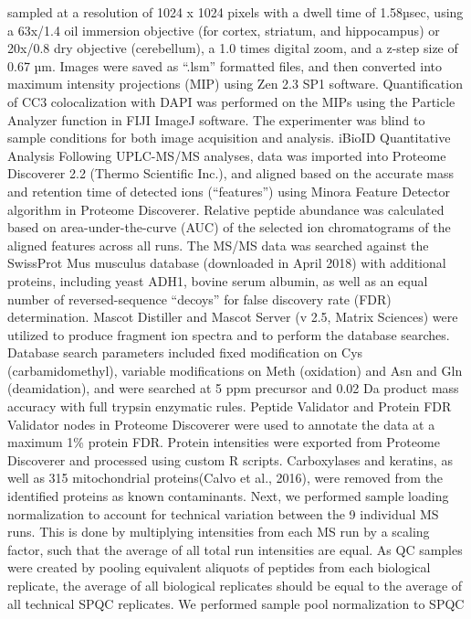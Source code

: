 sampled at a resolution of 1024 x 1024 pixels with a dwell time of 1.58µsec,
using a 63x/1.4 oil immersion objective (for cortex, striatum, and hippocampus)
or 20x/0.8 dry objective (cerebellum), a 1.0 times digital zoom, and a z-step
size of 0.67 µm. Images were saved as “.lsm” formatted files, and then converted
into maximum intensity projections (MIP) using Zen 2.3 SP1 software.
Quantification of CC3 colocalization with DAPI was performed on the MIPs using
the Particle Analyzer function in FIJI ImageJ software. The experimenter was
blind to sample conditions for both image acquisition and analysis. 
iBioID Quantitative Analysis
Following UPLC-MS/MS analyses, data was imported into Proteome Discoverer 2.2
(Thermo Scientific Inc.), and aligned based on the accurate mass and retention
time of detected ions (“features”) using Minora Feature Detector algorithm in
Proteome Discoverer. Relative peptide abundance was calculated based on
area-under-the-curve (AUC) of the selected ion chromatograms of the aligned
features across all runs. The MS/MS data was searched against the SwissProt Mus
musculus database (downloaded in April 2018) with additional proteins, including
yeast ADH1, bovine serum albumin, as well as an equal number of
reversed-sequence “decoys” for false discovery rate (FDR) determination. Mascot
Distiller and Mascot Server (v 2.5, Matrix Sciences) were utilized to produce
fragment ion spectra and to perform the database searches. Database search
parameters included fixed modification on Cys (carbamidomethyl), variable
modifications on Meth (oxidation) and Asn and Gln (deamidation), and were
searched at 5 ppm precursor and 0.02 Da product mass accuracy with full trypsin
enzymatic rules. Peptide Validator and Protein FDR Validator nodes in Proteome
Discoverer were used to annotate the data at a maximum 1\% protein FDR.
	Protein intensities were exported from Proteome Discoverer and processed
using custom R scripts. Carboxylases and keratins, as well as 315 mitochondrial
proteins(Calvo et al., 2016), were removed from the identified proteins as known
contaminants. Next, we performed sample loading normalization to account for
technical variation between the 9 individual MS runs. This is done by
multiplying intensities from each MS run by a scaling factor, such that the
average of all total run intensities are equal. As QC samples were created by
pooling equivalent aliquots of peptides from each biological replicate, the
average of all biological replicates should be equal to the average of all
technical SPQC replicates. We performed sample pool normalization to SPQC
